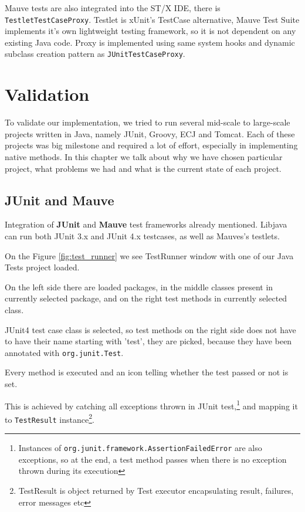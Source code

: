\documentclass[11pt,twoside,a4paper]{book}
\let\Chapter\chapter
\def\chapter{\addtocontents{lol}{\protect\addvspace{10pt}}\Chapter}
\newcommand{\libjava}{{Libjava}}
\begin{document}
Mauve tests are also integrated into the ST/X IDE, there is \texttt{TestletTestCaseProxy}.
Testlet is xUnit's TestCase alternative, Mauve Test Suite implements it's own lightweight testing framework, so it is not dependent on any existing Java code.
Proxy is implemented using same system hooks and dynamic subclass creation pattern as \texttt{JUnitTestCaseProxy}.

\chapter{Validation}
\label{chap:validation}

To validate our implementation, we tried to run several mid-scale to large-scale projects written in Java, namely JUnit, Groovy, ECJ and Tomcat.
Each of these projects was big milestone and required a lot of effort, especially in implementing native methods.
In this chapter we talk about why we have chosen particular project, what problems we had and what is the current state of each project.


\section{JUnit and Mauve}

Integration of \textbf{JUnit} and \textbf{Mauve} test frameworks already mentioned. \libjava{} can run both JUnit 3.x and JUnit 4.x testcases, as well as Mauves's testlets.

On the Figure \ref{fig:test_runner} we see TestRunner window with one of our Java Tests project loaded. 

On the left side there are loaded packages, in the middle classes present in currently selected package, and on the right test methods in currently selected class. 

JUnit4 test case class is selected, so test methods on the right side does not have to have their name starting with 'test', they are picked, because they have been annotated with \texttt{org.junit.Test}. 

Every method is executed and an icon telling whether the test passed or not is set. 

This is achieved by catching all exceptions thrown in JUnit test,\footnote{Instances of \texttt{org.junit.framework.AssertionFailedError} are also exceptions, so at the end, a test method passes when there is no exception thrown during its execution} and mapping it to \texttt{TestResult} instance\footnote{TestResult is object returned by Test executor encapsulating result, failures, error messages etc}.
\end{document}
